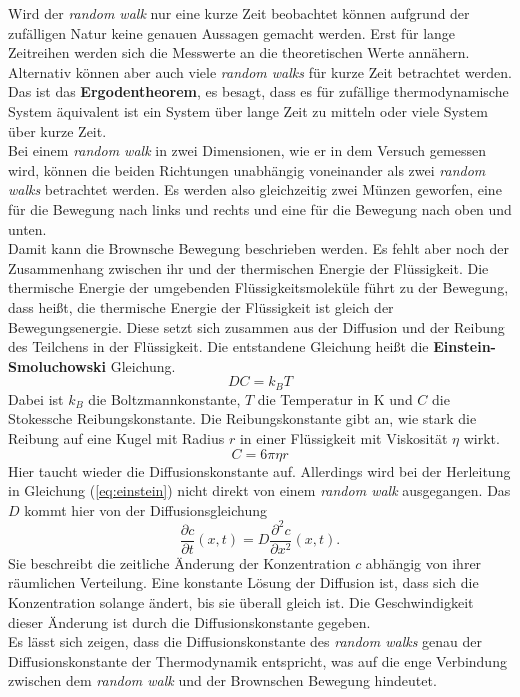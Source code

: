 Wird der \emph{random walk} nur eine kurze Zeit beobachtet können aufgrund der zufälligen Natur keine genauen Aussagen gemacht werden. Erst für lange Zeitreihen werden sich die Messwerte an die theoretischen Werte annähern. Alternativ können aber auch viele \emph{random walks} für kurze Zeit betrachtet werden. Das ist das \textbf{Ergodentheorem}, es besagt, dass es für zufällige thermodynamische System äquivalent ist ein System über lange Zeit zu mitteln oder viele System über kurze Zeit.\\
Bei einem \emph{random walk} in zwei Dimensionen, wie er in dem Versuch gemessen wird, können die beiden Richtungen unabhängig voneinander als zwei \emph{random walks} betrachtet werden. Es werden also gleichzeitig zwei Münzen geworfen, eine für die Bewegung nach links und rechts und eine für die Bewegung nach oben und unten.\\


Damit kann die Brownsche Bewegung beschrieben werden. Es fehlt aber noch der Zusammenhang zwischen ihr und der thermischen Energie der Flüssigkeit. Die thermische Energie der umgebenden Flüssigkeitsmoleküle führt zu der Bewegung, dass heißt, die thermische Energie der Flüssigkeit ist gleich der Bewegungsenergie. Diese setzt sich zusammen aus der Diffusion und der Reibung des Teilchens in der Flüssigkeit. Die entstandene Gleichung heißt die  \textbf{Einstein-Smoluchowski} Gleichung.
\begin{equation}
  D C = k_B T \label{eq:einstein}
\end{equation}
Dabei ist $k_B$ die Boltzmannkonstante, $T$ die Temperatur in K und $C$ die Stokessche Reibungskonstante. Die Reibungskonstante gibt an, wie stark die Reibung auf eine Kugel mit Radius $r$ in einer Flüssigkeit mit Viskosität $\eta$ wirkt.
\begin{equation}
  C = 6 \pi \eta r
\end{equation}
Hier taucht wieder die Diffusionskonstante auf. Allerdings wird bei der Herleitung in Gleichung (\ref{eq:einstein}) nicht direkt von einem \emph{random walk} ausgegangen. Das $D$ kommt hier von der Diffusionsgleichung
\begin{equation}
  \frac{\partial c}{\partial t}(x, t) = D \frac{\partial^2 c}{\partial x^2} (x, t). \label{eq:diffusion}
\end{equation}
Sie beschreibt die zeitliche Änderung der Konzentration $c$ abhängig von ihrer räumlichen Verteilung. Eine konstante Lösung der Diffusion ist, dass sich die Konzentration solange ändert, bis sie überall gleich ist. Die Geschwindigkeit dieser Änderung ist durch die Diffusionskonstante gegeben.\\
Es lässt sich zeigen, dass die Diffusionskonstante des \emph{random walks} genau der Diffusionskonstante der Thermodynamik entspricht, was auf die enge Verbindung zwischen dem \emph{random walk} und der Brownschen Bewegung hindeutet.
